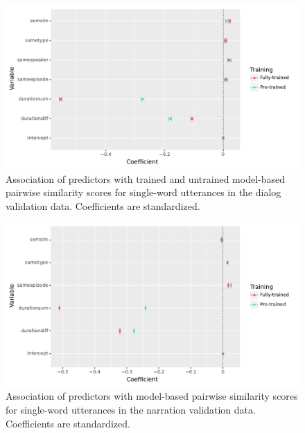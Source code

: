 \begin{figure}
  \centering
  \includegraphics[scale=0.66]{results/grsa_dialog_word_coef.pdf}
  \caption{Association of predictors with trained and untrained
    model-based pairwise similarity scores for single-word utterances
    in the dialog validation data. Coefficients are standardized.}
  \label{fig:coef_word_dialog}
\end{figure}

\begin{figure}
  \centering
  \includegraphics[scale=0.66]{results/grsa_narration_word_coef.pdf}
  \caption{Association of predictors with 
    model-based pairwise similarity scores for single-word utterances
    in the narration validation data. Coefficients are standardized.}
  \label{fig:coef_word_narration}
\end{figure}


